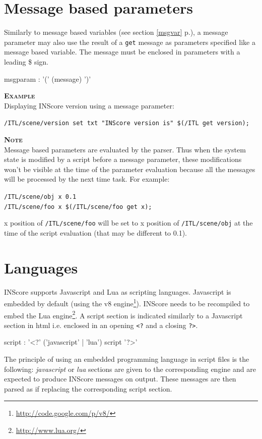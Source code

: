 \documentclass[a4paper,twoside]{report}
\newcommand{\sublevel}[1]	{\section{#1}}
\newcommand{\fullref}[1]	{\ref{#1} p.\pageref{#1}}
\newcommand{\OSC}[1]		{\texttt{#1}}
\newcommand{\example}		{\textbf{\hspace{-1.5cm}\textbf{\textsc{Example }}}}
\newcommand{\note}	[1]		{\vspace{2mm}\textbf{\hspace{-1.03cm}\textbf{\textsc{Note #1}}}}
\newcommand{\sample}	[1]			{\vspace{-2mm}\begin{center}\colorbox{mygrey}{
								\begin{minipage}[t]{0.9\columnwidth} 
								{\small \texttt{#1}}
								\end{minipage}}\end{center}}
\begin{document}
\sublevel{Message based parameters}\label{scriptmsgparam}

Similarly to message based variables (see section \fullref{msgvar}), a message parameter may also use the result of a \OSC{get} message as parameters specified like a message based variable.
The message must be enclosed in parameters with a leading \$ sign.
\begin{rail} 
msgparam : '(' (message) ')'
\end{rail}

\example \\
Displaying INScore version using a message parameter:
\sample{/ITL/scene/version set  txt "INScore version is" \$(/ITL get version);}

\note{}\\
Message based parameters are evaluated by the parser. Thus when the system state is modified by a script before a message parameter, these modifications won't be visible at the time of the parameter evaluation because all the messages will be processed by the next time task. For example:\\
\sample{/ITL/scene/obj x 0.1\\
/ITL/scene/foo x \$(/ITL/scene/foo get x);}
x position of \OSC{/ITL/scene/foo} will be set to x position of \OSC{/ITL/scene/obj} at the time of the script evaluation (that may be different to 0.1).

\sublevel{Languages}\label{scriptlang}


INScore supports Javascript and Lua as scripting languages. Javascript is embedded by default (using the v8 engine\footnote{\url{http://code.google.com/p/v8/}}). INScore needs to be recompiled to embed the Lua engine\footnote{\url{http://www.lua.org/}}. A script section is indicated similarly to a Javascript section in html i.e. enclosed in an opening \OSC{<?} and a closing \OSC{?>}.
\begin{rail} 
script : '<?' ('javascript' | 'lua') script '?>'
\end{rail}

The principle of using an embedded programming language in script files is the following: \emph{javascript} or \emph{lua} sections are given to the corresponding engine and are expected to produce INScore messages on output.
These messages are then parsed as if replacing the corresponding script section.
\end{document}
